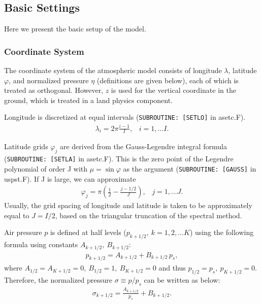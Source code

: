 \hypertarget{basic-settings}{%
\subsection{Basic Settings}\label{basic-settings}}

Here we present the basic setup of the model.

\hypertarget{coordinate-system}{%
\subsubsection{Coordinate System}\label{coordinate-system}}

The coordinate system of the atmospheric model consists of longitude \(\lambda\), latitude
\(\varphi\), and normalized pressure \(\eta\) (definitions are given
below), each of which is treated as orthogonal.
However, \(z\) is used
for the vertical coordinate in the ground, which is treated in a land physics component.

Longitude is discretized at equal intervals
(\texttt{SUBROUTINE:\ {[}SETLO{]}} in asetc.F).
\begin{eqnarray}
  \lambda_i = 2 \pi \frac{i-1}{I},  \;\;\; i = 1, \ldots I.
\end{eqnarray}

Latitude grids \(\varphi_j\) are derived from the
Gauss-Legendre integral formula (\texttt{SUBROUTINE:\ {[}SETLA{]}} in
asetc.F).
This is the zero point of the Legendre polynomial of order J
with \(\mu = \sin \varphi\) as the argument
(\texttt{SUBROUTINE:\ {[}GAUSS{]}} in uspst.F).
If J is large, we can approximate
\begin{eqnarray}
  \varphi_j =  \pi \left( \frac{1}{2}- \frac{j-1/2}{J} \right), \;\;\; j = 1, \ldots J.
\end{eqnarray}
Usually, the grid spacing of longitude and latitude is taken to be
approximately equal to \(J = I/2\), based on the triangular truncation of the spectral method.

Air pressure \(p\) is defined at half levels
(\(p_{k+1/2},\ k = 1, 2, \ldots K\)) using the following formula using
constants \(A_{k+1/2},\ B_{k+1/2}\):
\begin{eqnarray}
p_{k+1/2} = A_{k+1/2} +B_{k+1/2}\,p_s,
\end{eqnarray}
where \(A_{1/2}=A_{K+1/2}=0,\ B_{1/2}=1,\ B_{K+1/2}=0\) and thus
\(p_{1/2}=p_s,\ p_{K+1/2}=0\).
Therefore, the normalized pressure
\(\sigma\equiv p/p_s\) can be written as below:
\begin{eqnarray}
\sigma_{k+1/2} = \frac{A_{k+1/2}}{p_s} +B_{k+1/2}.
\end{eqnarray}

